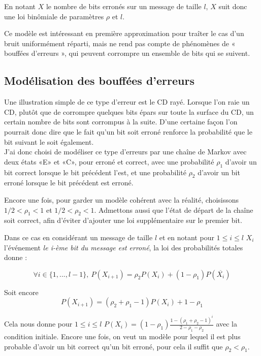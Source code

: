 \documentclass[10pt]{article}
\begin{document}
En notant $X$ le nombre de bits erronés sur un message de taille $l$, $X$ suit donc une loi binômiale de paramètres $\rho$ et $l$.

Ce modèle est intéressant en première approximation pour traîter le cas d'un bruit uniformément réparti, mais ne rend pas compte de phénomènes de « bouffées d'erreurs », qui peuvent corrompre un ensemble de bits qui se suivent.

\subsection{Modélisation des bouffées d'erreurs}
Une illustration simple de ce type d'erreur est le CD rayé. Lorsque l'on raie un CD, plutôt que de corrompre quelques bits épars sur toute la surface du CD, un certain nombre de bits sont corrompus à la suite.
D'une certaine façon l'on pourrait donc dire que le fait qu'un bit soit erroné renforce la probabilité que le bit suivant le soit également.\\
J'ai donc choisi de modéliser ce type d'erreurs par une chaîne de Markov avec deux états «E» et «C», pour erroné et correct, avec une probabilité $\rho_1$ d'avoir un bit correct lorsque le bit précédent l'est, et une probabilité $\rho_2$ d'avoir un bit erroné lorsque le bit précédent est erroné.

Encore une fois, pour garder un modèle cohérent avec la réalité, choisissons $1/2<\rho_1<1$ et $1/2<\rho_2<1$.
Admettons aussi que l'état de départ de la chaîne soit correct, afin d'éviter d'ajouter une loi supplémentaire sur le premier bit.

Dans ce cas en considérant un message de taille $l$ et en notant pour $1 \leq i \leq l$ $X_i$ l'événement \textit{le i-ème bit du message est erroné}, la loi des probabilités totales donne :

\begin{displaymath}
\forall i \in \lbrace 1,...,l-1 \rbrace, \ P(X_{i+1})=\rho_2 P(X_i) + (1-\rho_1) P(\overline{X_i})
\end{displaymath}

Soit encore
\begin{displaymath}
P(X_{i+1})=(\rho_2 + \rho_1 - 1) P(X_i) + 1-\rho_1
\end{displaymath}

Cela nous donne pour $1 \leq i \leq l$ $P(X_i)= (1- \rho_1) \frac{1 - (\rho_1 + \rho_2 - 1)^i}{2-\rho_1-\rho_2}$ avec la condition initiale. Encore une fois, on veut un modèle pour lequel il est plus probable d'avoir un bit correct qu'un bit erroné, pour cela il suffit que $\rho_2<\rho_1$.
\end{document}
